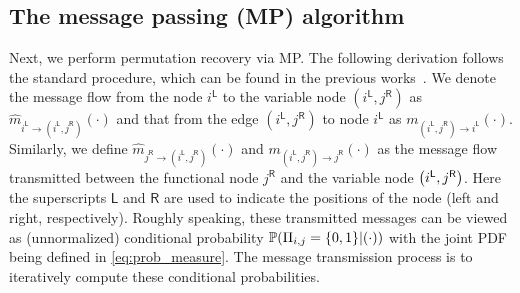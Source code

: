\documentclass[11pt]{article}
\def \vcinfo#1#2{m_{#1\rightarrow #2}}
\def \cvinfo#1#2{\hat{m}_{#1\rightarrow #2}}
\def\ln#1{{#1}^{\mathsf{L}}}
\def\rn#1{{#1}^{\mathsf{R}}}
\begin{document}
\subsection{The message passing (MP) algorithm}
Next, we perform permutation recovery via MP.
The following derivation follows the standard
procedure, which can be found in the previous works~\citep{mezard2009information,semerjian2020recovery}.
We denote the message flow from the node
$\ln{i}$ to the variable node $(\ln{i}, \rn{j})$ as
$\cvinfo{\ln{i}}{(\ln{i}, \rn{j})}(\cdot)$ and
that from the edge $(\ln{i}, \rn{j})$
to node $\ln{i}$ as
$\vcinfo{(\ln{i}, \rn{j})}{\ln{i}}(\cdot)$.
Similarly, we define
$\cvinfo{\rn{j}}{(\ln{i}, \rn{j})}(\cdot)$
and $\vcinfo{(\ln{i}, \rn{j})}{\rn{j}}(\cdot)$
as the message flow transmitted
between the functional node $\rn{j}$ and
the variable node $\bracket{\ln{i}, \rn{j}}$.
Here the superscripts $\mathsf{L}$ and $\mathsf{R}$ are used to
indicate the positions of the node (left and right, respectively). Roughly speaking, these
transmitted messages can be viewed as (unnormalized) conditional probability
$\mathbb{P}(\Pi_{i, j} = \{0, 1\}|(\cdot))$ with the joint PDF being defined in
\eqref{eq:prob_measure}.
The message transmission process
is to iteratively compute
these conditional probabilities.

\vspace{0.1in}
\end{document}
